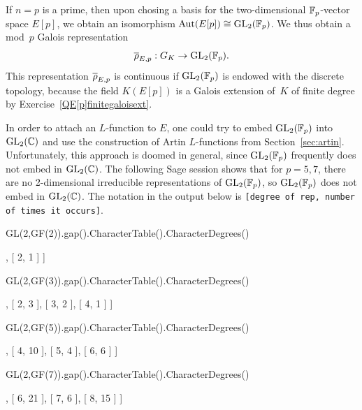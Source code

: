 If $n=p$ is a prime, then upon chosing a basis for the two-dimensional
$\mathbb{F}_p$-vector space $E[p]$, we obtain an isomorphism $\operatorname{Aut}(E[p]) \cong
\operatorname{GL}_2(\mathbb{F}_p)$.  We thus obtain a mod~$p$ Galois representation
$$
 \overline{\rho}_{E,p} : G_K \to \operatorname{GL}_2(\mathbb{F}_p).
$$
This representation $\overline{\rho}_{E,p}$ is continuous if $\operatorname{GL}_2(\mathbb{F}_p)$ is endowed with the
discrete topology, because the field $K(E[p])$
is a Galois extension of~$K$ of finite degree
by Exercise~\ref{QE[p]finitegaloisext}.

In order to attach an $L$-function to $E$, one could try to embed
$\operatorname{GL}_2(\mathbb{F}_p)$ into $\operatorname{GL}_2(\mathbb{C})$ and use the construction of Artin
$L$-functions from Section~\ref{sec:artin}.
Unfortunately, this approach is doomed in general, since
$\operatorname{GL}_2(\mathbb{F}_p)$ frequently does not embed in $\operatorname{GL}_2(\mathbb{C})$.
The following Sage session shows that for $p=5,7$, there are
no 2-dimensional irreducible representations of $\operatorname{GL}_2(\mathbb{F}_p)$,
so $\operatorname{GL}_2(\mathbb{F}_p)$ does not embed in $\operatorname{GL}_2(\mathbb{C})$.
The notation in the output below is
{\tt [degree of rep, number of times it occurs]}.
\begin{sagecode}
\begin{sagecell}
GL(2,GF(2)).gap().CharacterTable().CharacterDegrees()
\end{sagecell}
\begin{sageout}
[ [ 1, 2 ], [ 2, 1 ] ]
\end{sageout}
\begin{sagecell}
GL(2,GF(3)).gap().CharacterTable().CharacterDegrees()
\end{sagecell}
\begin{sageout}
[ [ 1, 2 ], [ 2, 3 ], [ 3, 2 ], [ 4, 1 ] ]
\end{sageout}
\begin{sagecell}
GL(2,GF(5)).gap().CharacterTable().CharacterDegrees()
\end{sagecell}
\begin{sageout}
[ [ 1, 4 ], [ 4, 10 ], [ 5, 4 ], [ 6, 6 ] ]
\end{sageout}
\begin{sagecell}
GL(2,GF(7)).gap().CharacterTable().CharacterDegrees()
\end{sagecell}
\begin{sageout}
[ [ 1, 6 ], [ 6, 21 ], [ 7, 6 ], [ 8, 15 ] ]
\end{sageout}
\end{sagecode}

